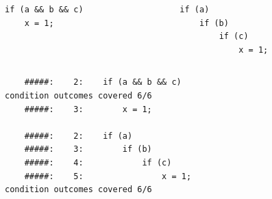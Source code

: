\documentclass[xcolor = {dvipsnames, table}]{beamer}
\begin{document}
\begin{frame}[fragile]
    \begin{columns}
        \begin{column}{0.5\textwidth}
            \centering
            \begin{lstlisting}
if (a && b && c)
    x = 1;
            \end{lstlisting}
        \end{column}

        \begin{column}{0.5\textwidth}
            \centering
            \begin{lstlisting}
if (a)
    if (b)
        if (c)
            x = 1;
            \end{lstlisting}
        \end{column}
    \end{columns}

    \centering
    \pause
    \begin{lstlisting}
    #####:    2:    if (a && b && c)
condition outcomes covered 6/6
    #####:    3:        x = 1;

    #####:    2:    if (a)
    #####:    3:        if (b)
    #####:    4:            if (c)
    #####:    5:                x = 1;
condition outcomes covered 6/6
    \end{lstlisting}
\end{frame}
\end{document}
